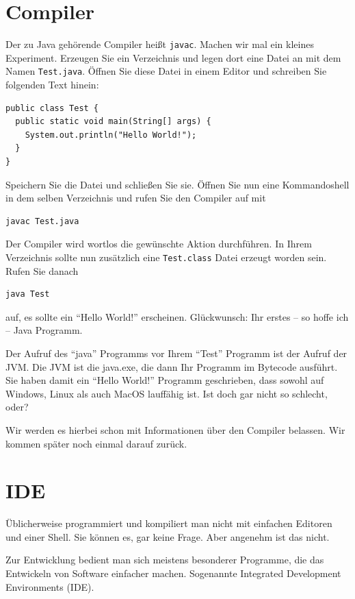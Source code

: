 \section{Compiler}

Der zu Java gehörende Compiler heißt \texttt{javac}. Machen wir mal ein kleines Experiment. Erzeugen Sie ein Verzeichnis und legen dort eine Datei an mit dem Namen \texttt{Test.java}. Öffnen Sie diese Datei in einem Editor und schreiben Sie folgenden Text hinein:

\begin{lstlisting}
public class Test {
  public static void main(String[] args) {
    System.out.println("Hello World!");
  }
}
\end{lstlisting}\label{code:test}

Speichern Sie die Datei und schließen Sie sie. Öffnen Sie nun eine Kommandoshell in dem selben Verzeichnis und rufen Sie den Compiler auf mit 
\begin{Verbatim}
javac Test.java
\end{Verbatim}
Der Compiler wird wortlos die gewünschte Aktion durchführen. In Ihrem Verzeichnis sollte nun zusätzlich eine \texttt{Test.class} Datei erzeugt worden sein. Rufen Sie danach 
\begin{Verbatim}
java Test
\end{Verbatim}
auf, es sollte ein "`Hello World!"' erscheinen. Glückwunsch: Ihr erstes -- so hoffe ich -- Java Programm.

Der Aufruf des "`java"' Programms vor Ihrem "`Test"' Programm ist der Aufruf der JVM. Die JVM ist die java.exe, die dann Ihr Programm im Bytecode ausführt. Sie haben damit ein "`Hello World!"' Programm geschrieben, dass sowohl auf Windows, Linux als auch MacOS lauffähig ist. Ist doch gar nicht so schlecht, oder?

Wir werden es hierbei schon mit Informationen über den Compiler belassen. Wir kommen später noch einmal darauf zurück. 

\section{IDE}

Üblicherweise programmiert und kompiliert man nicht mit einfachen Editoren und einer Shell. Sie können es, gar keine Frage. Aber angenehm ist das nicht. 

Zur Entwicklung bedient man sich meistens besonderer Programme, die das Entwickeln von Software einfacher machen. Sogenannte Integrated Development Environments (IDE). 

